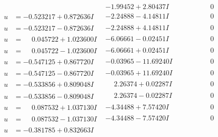 \documentclass[1p]{elsarticle_modified}
\theoremstyle{definition}
\begin{document}
$$\begin{array}{c|c|c}
 & -1.99452 + 2.80437 I & \phantom{-0.000000 } 0 \\ \hline\begin{aligned}
u &= -0.523217 + 0.872636 I\end{aligned}
 & -2.24888 - 4.14811 I & \phantom{-0.000000 } 0 \\ \hline\begin{aligned}
u &= -0.523217 - 0.872636 I\end{aligned}
 & -2.24888 + 4.14811 I & \phantom{-0.000000 } 0 \\ \hline\begin{aligned}
u &= \phantom{-}0.045722 + 1.023600 I\end{aligned}
 & -6.06661 - 0.02451 I & \phantom{-0.000000 } 0 \\ \hline\begin{aligned}
u &= \phantom{-}0.045722 - 1.023600 I\end{aligned}
 & -6.06661 + 0.02451 I & \phantom{-0.000000 } 0 \\ \hline\begin{aligned}
u &= -0.547125 + 0.867720 I\end{aligned}
 & -0.03965 - 11.69240 I & \phantom{-0.000000 } 0 \\ \hline\begin{aligned}
u &= -0.547125 - 0.867720 I\end{aligned}
 & -0.03965 + 11.69240 I & \phantom{-0.000000 } 0 \\ \hline\begin{aligned}
u &= -0.533856 + 0.809048 I\end{aligned}
 & \phantom{-}2.26374 + 0.02287 I & \phantom{-0.000000 } 0 \\ \hline\begin{aligned}
u &= -0.533856 - 0.809048 I\end{aligned}
 & \phantom{-}2.26374 - 0.02287 I & \phantom{-0.000000 } 0 \\ \hline\begin{aligned}
u &= \phantom{-}0.087532 + 1.037130 I\end{aligned}
 & -4.34488 + 7.57420 I & \phantom{-0.000000 } 0 \\ \hline\begin{aligned}
u &= \phantom{-}0.087532 - 1.037130 I\end{aligned}
 & -4.34488 - 7.57420 I & \phantom{-0.000000 } 0 \\ \hline\begin{aligned}
u &= -0.381785 + 0.832663 I\end{aligned}

\end{array}$$
\end{document}
